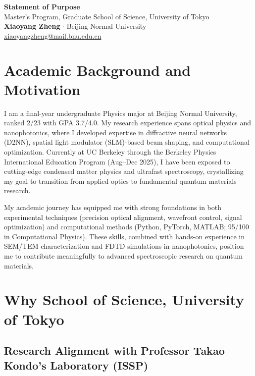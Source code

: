 \documentclass[11pt,a4paper]{article}
\begin{document}
\begin{center}
    {\Large \textbf{Statement of Purpose}}\\[0.4em]
    {\large Master's Program, Graduate School of Science, University of Tokyo}\\[0.8em]
    \textbf{Xiaoyang Zheng} $\cdot$ Beijing Normal University\\
    \href{mailto:xiaoyangzheng@mail.bnu.edu.cn}{xiaoyangzheng@mail.bnu.edu.cn}
\end{center}

\vspace{-0.3em}

\section{Academic Background and Motivation}

I am a final-year undergraduate Physics major at Beijing Normal University, ranked 2/23 with GPA 3.7/4.0. My research experience spans optical physics and nanophotonics, where I developed expertise in diffractive neural networks (D2NN), spatial light modulator (SLM)-based beam shaping, and computational optimization. Currently at UC Berkeley through the Berkeley Physics International Education Program (Aug--Dec 2025), I have been exposed to cutting-edge condensed matter physics and ultrafast spectroscopy, crystallizing my goal to transition from applied optics to fundamental quantum materials research.

My academic journey has equipped me with strong foundations in both experimental techniques (precision optical alignment, wavefront control, signal optimization) and computational methods (Python, PyTorch, MATLAB; 95/100 in Computational Physics). These skills, combined with hands-on experience in SEM/TEM characterization and FDTD simulations in nanophotonics, position me to contribute meaningfully to advanced spectroscopic research on quantum materials.

\section{Why School of Science, University of Tokyo}

\subsection{Research Alignment with Professor Takao Kondo's Laboratory (ISSP)}
\end{document}
